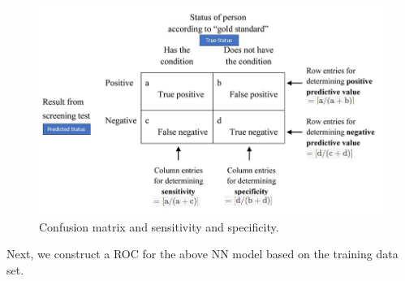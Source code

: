 \documentclass[
]{book}
\begin{document}
\begin{figure}

{\centering \includegraphics[width=0.95\linewidth]{img07/w07-SenSpec} 

}

\caption{Confusion matrix and sensitivity and specificity.}\label{fig:unnamed-chunk-157}
\end{figure}

Next, we construct a ROC for the above NN model based on the training data set.
\end{document}
